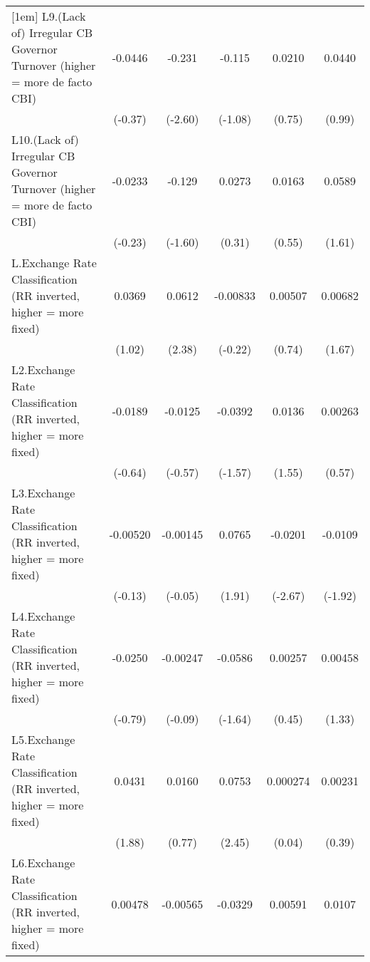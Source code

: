 {\begin{longtable}{l*{5}{c}}
[1em]
L9.(Lack of) Irregular CB Governor Turnover (higher = more de facto CBI)&  -0.0446         &   -0.231\sym{*}  &   -0.115         &   0.0210         &   0.0440         \\
                &  (-0.37)         &  (-2.60)         &  (-1.08)         &   (0.75)         &   (0.99)         \\
[1em]
L10.(Lack of) Irregular CB Governor Turnover (higher = more de facto CBI)&  -0.0233         &   -0.129         &   0.0273         &   0.0163         &   0.0589         \\
                &  (-0.23)         &  (-1.60)         &   (0.31)         &   (0.55)         &   (1.61)         \\
[1em]
L.Exchange Rate Classification (RR inverted, higher = more fixed)&   0.0369         &   0.0612\sym{*}  & -0.00833         &  0.00507         &  0.00682         \\
                &   (1.02)         &   (2.38)         &  (-0.22)         &   (0.74)         &   (1.67)         \\
[1em]
L2.Exchange Rate Classification (RR inverted, higher = more fixed)&  -0.0189         &  -0.0125         &  -0.0392         &   0.0136         &  0.00263         \\
                &  (-0.64)         &  (-0.57)         &  (-1.57)         &   (1.55)         &   (0.57)         \\
[1em]
L3.Exchange Rate Classification (RR inverted, higher = more fixed)& -0.00520         & -0.00145         &   0.0765         &  -0.0201\sym{**} &  -0.0109         \\
                &  (-0.13)         &  (-0.05)         &   (1.91)         &  (-2.67)         &  (-1.92)         \\
[1em]
L4.Exchange Rate Classification (RR inverted, higher = more fixed)&  -0.0250         & -0.00247         &  -0.0586         &  0.00257         &  0.00458         \\
                &  (-0.79)         &  (-0.09)         &  (-1.64)         &   (0.45)         &   (1.33)         \\
[1em]
L5.Exchange Rate Classification (RR inverted, higher = more fixed)&   0.0431         &   0.0160         &   0.0753\sym{*}  & 0.000274         &  0.00231         \\
                &   (1.88)         &   (0.77)         &   (2.45)         &   (0.04)         &   (0.39)         \\
[1em]
L6.Exchange Rate Classification (RR inverted, higher = more fixed)&  0.00478         & -0.00565         &  -0.0329         &  0.00591         &   0.0107\sym{*}  \\

\end{longtable}}
